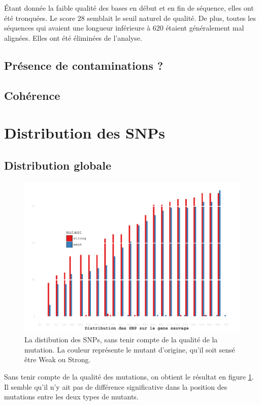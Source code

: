 \documentclass[a4paper]{tufte-handout}
\begin{document}
Étant donnée la faible qualité des bases en début et en fin de séquence, elles
ont été tronquées. Le score \(28\) semblait le seuil naturel de qualité. De plus,
toutes les séquences qui avaient une longueur inférieure à \(620\) étaient
généralement mal alignées. Elles ont été éliminées de l'analyse. 

\subsection{Présence de contaminations ?}
\label{sec:orgheadline2}
\subsection{Cohérence}
\label{sec:orgheadline3}

\newpage
\section{Distribution des SNPs}
\label{sec:orgheadline8}
\subsection{Distribution globale}
\label{sec:orgheadline5}
\begin{figure}[h]
  \centering
  \includegraphics[width=\linewidth]{../snp_distribution.pdf}
  \caption{La distibution des SNPs, sans tenir compte de la qualité de la
    mutation. La couleur représente le mutant d'origine, qu'il soit sensé être
    Weak ou Strong.}
  \label{figure1}
\end{figure}

Sans tenir compte de la qualité des mutations, on obtient le résultat en figure
\ref{figure1}. Il semble qu'il n'y ait pas de différence significative dans la
position des mutations entre les deux types de mutants.
\end{document}
